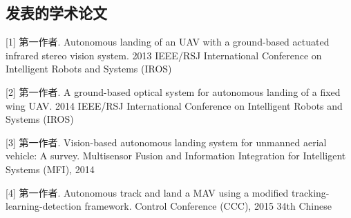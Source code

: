 \begin{resume}

\section*{发表的学术论文} %

[1] 第一作者. Autonomous landing of an UAV with a ground-based actuated infrared stereo vision system.	2013 IEEE/RSJ International Conference on Intelligent Robots and Systems (IROS)

[2] 第一作者. A ground-based optical system for autonomous landing of a fixed wing UAV.	2014 IEEE/RSJ International Conference on Intelligent Robots and Systems	(IROS)

[3] 第一作者. Vision-based autonomous landing system for unmanned aerial vehicle: A survey.	Multisensor Fusion and Information Integration for Intelligent Systems (MFI),  2014

[4] 第一作者. Autonomous track and land a MAV using a modified tracking-learning-detection framework. Control Conference (CCC), 2015 34th Chinese 




\end{resume}
